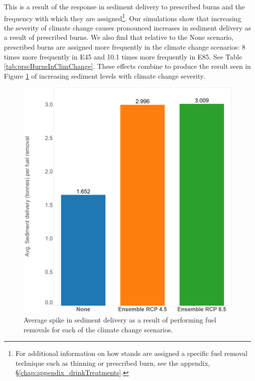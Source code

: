 This is a result of the response in sediment delivery to prescribed burns and the frequency with which they are assigned\footnote{For additional information on how stands are assigned a specific fuel removal technique such as thinning or prescribed burn, see the appendix, \S \ref{chap:appendix_drinkTreatments}.}. Our simulations show that increasing the severity of climate change causes pronounced increases in sediment delivery as a result of prescribed burns. We also find that relative to the None scenario, prescribed burns are assigned more frequently in the climate change scenarios: 8 times more frequently in E45 and 10.1 times more frequently in E85. See Table \ref{tab:prscBurnsInClimChange}. These effects combine to produce the result seen in Figure \ref{fig:avgSedimentDelivery} of increasing sediment levels with climate change severity.

\begin{figure}[ht]
\centering
\includegraphics[width=.55\textwidth]{../images/AvgSedimentSpikes}
\caption[Average sediment delivery across climate scenarios]{Average spike in sediment delivery as a result of performing fuel removals for each of the climate change scenarios.}
\label{fig:avgSedimentDelivery}
\end{figure}

